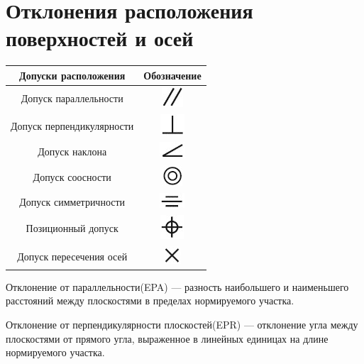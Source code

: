 \section{Отклонения расположения поверхностей и осей}

\begin{tabular}{|c|c|}
	\hline 
	Допуски расположения & Обозначение \\ 
	\hline 
	Допуск параллельности & \includegraphics{pic/dop_rasp/index.jpg}  \\ 
	\hline 
	Допуск перпендикулярности & \includegraphics{pic/dop_rasp/index1.jpg} \\ 
	\hline 
	Допуск наклона & \includegraphics{pic/dop_rasp/index2.jpg} \\ 
	\hline 
	Допуск соосности & \includegraphics{pic/dop_rasp/index4.jpg} \\ 
	\hline 
	Допуск симметричности & \includegraphics{pic/dop_rasp/index6.jpg} \\ 
	\hline 
	Позиционный допуск & \includegraphics{pic/dop_rasp/index7.jpg} \\ 
	\hline 
	Допуск пересечения осей & \includegraphics{pic/dop_rasp/index8.jpg} \\ 
	\hline 
\end{tabular} 

Отклонение от параллельности(EPA) --- разность наибольшего и наименьшего расстояний между плоскостями в пределах нормируемого участка.

Отклонение от перпендикулярности плоскостей(EPR) --- отклонение угла между плоскостями от прямого угла, выраженное в линейных единицах на длине нормируемого участка.

